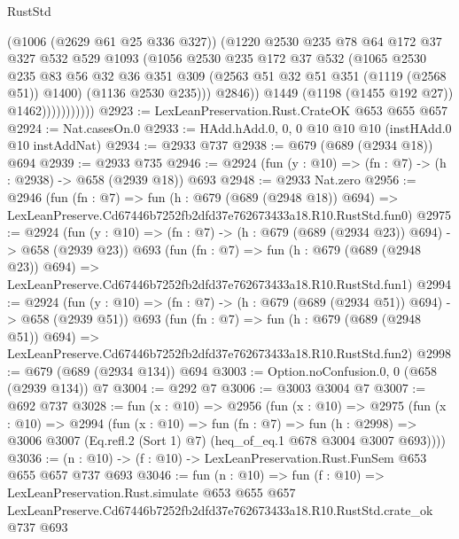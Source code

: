 \begin{lexlean}{RustStd}
\begin{coremodule}
                            (@1006 (@2629 @61 @25 @336 @327))
                            (@1220
                              @2530
                              @235
                              @78
                              @64
                              @172
                              @37
                              @327
                              @532
                              @529
                              @1093
                              (@1056
                                @2530
                                @235
                                @172
                                @37
                                @532
                                (@1065
                                  @2530
                                  @235
                                  @83
                                  @56
                                  @32
                                  @36
                                  @351
                                  @309
                                  (@2563 @51 @32 @51 @351 (@1119 (@2568 @51)) @1400)
                                  (@1136 @2530 @235)))
                              @2846))
                          @1449
                          (@1198 (@1455 @192 @27))
                          @1462)))))))))))
@2923 := LexLeanPreservation.Rust.CrateOK @653 @655 @657
@2924 := Nat.casesOn.{0}
@2933 := HAdd.hAdd.{0, 0, 0} @10 @10 @10 (instHAdd.{0} @10 instAddNat)
@2934 := @2933 @737
@2938 := @679 (@689 (@2934 @18)) @694
@2939 := @2933 @735
@2946 := @2924 (fun (y : @10) => (fn : @7) -> (h : @2938) -> @658 (@2939 @18)) @693
@2948 := @2933 Nat.zero
@2956 := @2946
    (fun (fn : @7) =>
    fun (h : @679 (@689 (@2948 @18)) @694) =>
    LexLeanPreserve.Cd67446b7252fb2dfd37e762673433a18.R10.RustStd.fun0)
@2975 := @2924
    (fun (y : @10) => (fn : @7) -> (h : @679 (@689 (@2934 @23)) @694) -> @658 (@2939 @23))
    @693
    (fun (fn : @7) =>
    fun (h : @679 (@689 (@2948 @23)) @694) =>
    LexLeanPreserve.Cd67446b7252fb2dfd37e762673433a18.R10.RustStd.fun1)
@2994 := @2924
    (fun (y : @10) => (fn : @7) -> (h : @679 (@689 (@2934 @51)) @694) -> @658 (@2939 @51))
    @693
    (fun (fn : @7) =>
    fun (h : @679 (@689 (@2948 @51)) @694) =>
    LexLeanPreserve.Cd67446b7252fb2dfd37e762673433a18.R10.RustStd.fun2)
@2998 := @679 (@689 (@2934 @134)) @694
@3003 := Option.noConfusion.{0, 0} (@658 (@2939 @134)) @7
@3004 := @292 @7
@3006 := @3003 @3004 @7
@3007 := @692 @737
@3028 := fun (x : @10) =>
  @2956
    (fun (x : @10) =>
    @2975
      (fun (x : @10) =>
      @2994
        (fun (x : @10) =>
        fun (fn : @7) =>
        fun (h : @2998) =>
        @3006 @3007 (Eq.refl.{2} (Sort 1) @7) (heq_of_eq.{1} @678 @3004 @3007 @693))))
@3036 := (n : @10) -> (f : @10) -> LexLeanPreservation.Rust.FunSem @653 @655 @657 @737 @693
@3046 := fun (n : @10) =>
  fun (f : @10) =>
  LexLeanPreservation.Rust.simulate
    @653
    @655
    @657
    LexLeanPreserve.Cd67446b7252fb2dfd37e762673433a18.R10.RustStd.crate_ok
    @737
    @693
\end{coremodule}
\end{lexlean}
